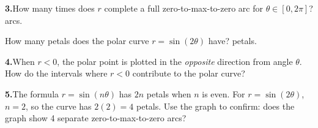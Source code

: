 \documentclass[10pt]{article}
\begin{document}
\begin{tcolorbox}[colback=white, colframe=black!40,
    title=\textbf{Tier A --- Apply},
    fonttitle=\bfseries, arc=2mm, left=3mm, right=3mm, top=2mm, bottom=2mm]
\vspace{6pt}
\textbf{3.}\quad How many times does $r$ complete a full zero-to-max-to-zero arc
for $\theta \in [0, 2\pi]$? \underline{\hspace{1.5cm}} arcs.

\vspace{4pt}
How many petals does the polar curve $r = \sin(2\theta)$ have?
\underline{\hspace{1.5cm}} petals.

\vspace{6pt}
\textbf{4.}\quad When $r < 0$, the polar point is plotted in the
\emph{opposite} direction from angle $\theta$.
How do the intervals where $r < 0$ contribute to the polar curve?


\vspace{6pt}
\textbf{5.}\quad The formula $r = \sin(n\theta)$ has $2n$ petals when $n$ is even.
For $r = \sin(2\theta)$, $n = 2$, so the curve has $2(2) = 4$ petals.
Use the graph to confirm: does the graph show 4 separate zero-to-max-to-zero arcs?
\writeline

\end{tcolorbox}

\vspace{0.08in}
\end{document}

